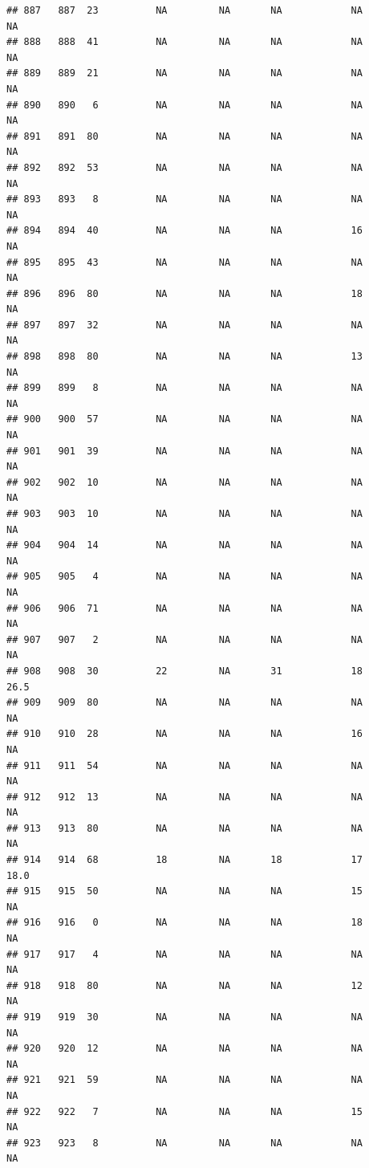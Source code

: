 \documentclass[man]{apa6}
\begin{document}
\begin{verbatim}
## 887   887  23          NA         NA       NA            NA       NA
## 888   888  41          NA         NA       NA            NA       NA
## 889   889  21          NA         NA       NA            NA       NA
## 890   890   6          NA         NA       NA            NA       NA
## 891   891  80          NA         NA       NA            NA       NA
## 892   892  53          NA         NA       NA            NA       NA
## 893   893   8          NA         NA       NA            NA       NA
## 894   894  40          NA         NA       NA            16       NA
## 895   895  43          NA         NA       NA            NA       NA
## 896   896  80          NA         NA       NA            18       NA
## 897   897  32          NA         NA       NA            NA       NA
## 898   898  80          NA         NA       NA            13       NA
## 899   899   8          NA         NA       NA            NA       NA
## 900   900  57          NA         NA       NA            NA       NA
## 901   901  39          NA         NA       NA            NA       NA
## 902   902  10          NA         NA       NA            NA       NA
## 903   903  10          NA         NA       NA            NA       NA
## 904   904  14          NA         NA       NA            NA       NA
## 905   905   4          NA         NA       NA            NA       NA
## 906   906  71          NA         NA       NA            NA       NA
## 907   907   2          NA         NA       NA            NA       NA
## 908   908  30          22         NA       31            18     26.5
## 909   909  80          NA         NA       NA            NA       NA
## 910   910  28          NA         NA       NA            16       NA
## 911   911  54          NA         NA       NA            NA       NA
## 912   912  13          NA         NA       NA            NA       NA
## 913   913  80          NA         NA       NA            NA       NA
## 914   914  68          18         NA       18            17     18.0
## 915   915  50          NA         NA       NA            15       NA
## 916   916   0          NA         NA       NA            18       NA
## 917   917   4          NA         NA       NA            NA       NA
## 918   918  80          NA         NA       NA            12       NA
## 919   919  30          NA         NA       NA            NA       NA
## 920   920  12          NA         NA       NA            NA       NA
## 921   921  59          NA         NA       NA            NA       NA
## 922   922   7          NA         NA       NA            15       NA
## 923   923   8          NA         NA       NA            NA       NA

\end{verbatim}
\end{document}
